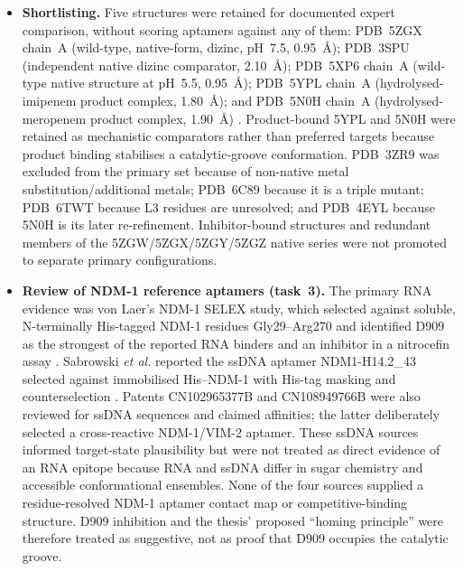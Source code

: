 \begin{itemize}
  \item \textbf{Shortlisting.}  Five structures were retained for documented
  expert comparison, without scoring aptamers against any of them: PDB~5ZGX
  chain~A (wild-type, native-form, dizinc, pH~7.5, 0.95~\AA{}); PDB~3SPU
  (independent native dizinc comparator, 2.10~\AA{}); PDB~5XP6 chain~A
  (wild-type native structure at pH~5.5, 0.95~\AA{}); PDB~5YPL chain~A
  (hydrolysed-imipenem product complex, 1.80~\AA{}); and PDB~5N0H chain~A
  (hydrolysed-meropenem product complex, 1.90~\AA{})
  \cite{king_crystal_2011,king_ndm1_2013,zhang_active-site_2018}.  Product-bound
  5YPL and 5N0H were retained as mechanistic comparators rather than preferred
  targets because product binding stabilises a catalytic-groove conformation.
  PDB~3ZR9 was excluded from the primary set because of non-native metal
  substitution/additional metals; PDB~6C89 because it is a triple mutant;
  PDB~6TWT because L3 residues are unresolved; and PDB~4EYL because 5N0H is its
  later re-refinement.  Inhibitor-bound structures and redundant members of
  the 5ZGW/5ZGX/5ZGY/5ZGZ native series were not promoted to separate primary
  configurations.

  \item \textbf{Review of NDM-1 reference aptamers (task~3).}  The primary RNA
  evidence was von Laer's NDM-1 SELEX study, which selected against soluble,
  N-terminally His-tagged NDM-1 residues Gly29--Arg270 and identified D909 as
  the strongest of the reported RNA binders and an inhibitor in a nitrocefin
  assay \cite{ludwig_von_laer_selektion_2013}.  Sabrowski \textit{et al.}
  reported the ssDNA aptamer NDM1-H14.2\_43 selected against immobilised
  His--NDM-1 with His-tag masking and counterselection
  \cite{sabrowski_use_2022}.  Patents CN102965377B and CN108949766B were also
  reviewed for ssDNA sequences and claimed affinities; the latter deliberately
  selected a cross-reactive NDM-1/VIM-2 aptamer.  These ssDNA sources informed
  target-state plausibility but were not treated as direct evidence of an RNA
  epitope because RNA and ssDNA differ in sugar chemistry and accessible
  conformational ensembles.  None of the four sources supplied a
  residue-resolved NDM-1 aptamer contact map or competitive-binding structure.
  D909 inhibition and the thesis' proposed ``homing principle'' were therefore
  treated as suggestive, not as proof that D909 occupies the catalytic groove.


\end{itemize}

